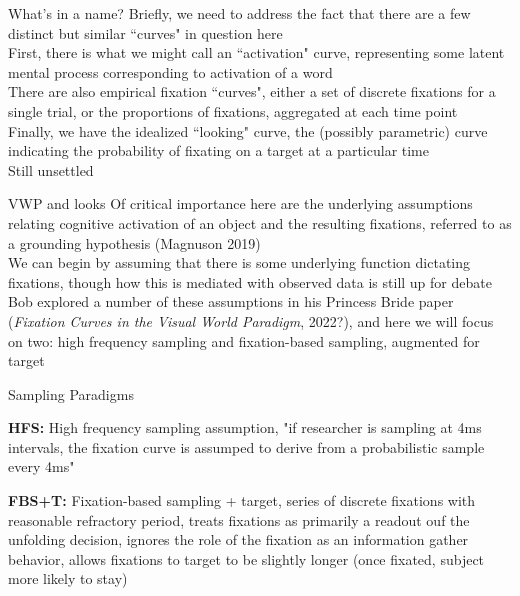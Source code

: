 \documentclass{beamer}
\begin{document}
\begin{frame}{What's in a name?}
Briefly, we need to address the fact that there are a few distinct but similar ``curves" in question here \newline \\

First, there is what we might call an ``activation" curve, representing some latent mental process corresponding to activation of a word \newline \\

There are also empirical fixation ``curves", either a set of discrete fixations for a single trial, or the proportions of fixations, aggregated at each time point \newline \\

Finally, we have the idealized ``looking" curve, the (possibly parametric) curve indicating the probability of fixating on a target at a particular time \newline \\

Still unsettled
\end{frame}

\begin{frame}{VWP and looks}
Of critical importance here are the underlying assumptions relating cognitive activation of an object and the resulting fixations, referred to as a grounding hypothesis (Magnuson 2019) \newline \\

We can begin by assuming that there is some underlying function dictating fixations, though how this is mediated with observed data is still up for debate \newline \\

Bob explored a number of these assumptions in his Princess Bride paper (\textit{Fixation Curves in the Visual World Paradigm}, 2022?), and here we will focus on two: high frequency sampling and fixation-based sampling, augmented for target

\end{frame}


\begin{frame}{Sampling Paradigms}

\textbf{HFS:} High frequency sampling assumption, "if researcher is sampling at 4ms intervals, the fixation curve is assumped to derive from a probabilistic sample every 4ms" \newline 

\textbf{FBS+T:} Fixation-based sampling + target, series of discrete fixations with reasonable refractory period, treats fixations as primarily a readout ouf the unfolding decision, ignores the role of the fixation as an information gather behavior, allows fixations to target to be slightly longer (once fixated, subject more likely to stay)
\end{frame}
\end{document}
